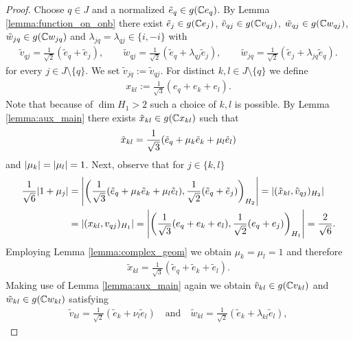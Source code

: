 \begin{proof}
	Choose $q \in J$ and a normalized $\tilde{e}_q \in g{\left ( \mathbb{C} e_q \right )}$. By Lemma \ref{lemma:function_on_onb} there exist $\tilde{e}_j \in g(\mathbb{C} e_j)$, $\tilde{v}_{qj} \in g(\mathbb{C} v_{qj})$, $\tilde{w}_{qj} \in g(\mathbb{C} w_{qj})$, $\tilde{w}_{jq} \in g(\mathbb{C} w_{jq})$ and $\lambda_{jq} = \lambda_{qj} \in \{i, -i\}$ with
	\begin{align*}
	\tilde{v}_{qj} = \frac{1}{\sqrt{2}}(\tilde{e}_q + \tilde{e}_j), \qquad \tilde{w}_{qj} = \frac{1}{\sqrt{2}}(\tilde{e}_q + \lambda_{qj}\tilde{e}_j), \qquad \tilde{w}_{jq} = \frac{1}{\sqrt{2}}(\tilde{e}_j + \lambda_{jq} \tilde{e}_q).
	\end{align*} 
	 for every $j \in J \setminus \{q\}$. We set $\tilde{v}_{jq} := \tilde{v}_{qj}$. For distinct $k,l \in J \setminus \{q\}$ we define
	\begin{align*}
	x_{kl} := \frac{1}{\sqrt{3}}(e_q + e_k + e_l). 
	\end{align*} 
	Note that because of $\dim H_1 > 2$ such a choice of $k,l$ is possible. By Lemma \ref{lemma:aux_main} there exists $\tilde{x}_{kl} \in g(\mathbb{C} x_{kl})$ such that 
	\begin{align*}
	\tilde{x}_{kl} = \frac{1}{\sqrt{3}} {\left ( \tilde{e}_q + \mu_{k} \tilde{e}_k + \mu_{l} \tilde{e}_l \right )} 
	\end{align*}
	and ${\left | \mu_k \right |} = {\left | \mu_l \right |} = 1$. Next, observe that for $j \in \{k,l\}$
	\begin{align*}
	\frac{1}{\sqrt{6}} {\left | 1 + \mu_j \right |} &= {\left | {\left ( \frac{1}{\sqrt{3}} {\left ( \tilde{e}_q + \mu_k \tilde{e}_k + \mu_l \tilde{e}_l \right )}, \frac{1}{\sqrt{2}} {\left ( \tilde{e}_q + \tilde{e}_j \right )} \right )}_{H_2} \right |} = |(\tilde{x}_{kl}, \tilde{v}_{qj})_{H_2}| \\
	&= |(x_{kl}, v_{qj})_{H_1}| = {\left | {\left ( \frac{1}{\sqrt{3}} {\left ( e_q + e_k + e_l \right )}, \frac{1}{\sqrt{2}} (e_q + e_j) \right )}_{H_1} \right |} = \frac{2}{\sqrt{6}}.
	\end{align*}
	Employing Lemma \ref{lemma:complex_geom} we obtain $\mu_k = \mu_l = 1$ and therefore
	\begin{align*}
	\tilde{x}_{kl} = \frac{1}{\sqrt{3}}(\tilde{e}_q + \tilde{e}_k + \tilde{e}_l).
	\end{align*}
	Making use of Lemma \ref{lemma:aux_main} again we obtain $\tilde{v}_{kl} \in g(\mathbb{C} v_{kl})$ and $\tilde{w}_{kl} \in g(\mathbb{C} w_{kl})$ satisfying
	\begin{align*}
	\tilde{v}_{kl} = \frac{1}{\sqrt{2}}(\tilde{e}_k + \nu_l \tilde{e}_l) \quad \text{and} \quad \tilde{w}_{kl} = \frac{1}{\sqrt{2}}(\tilde{e}_k + \lambda_{kl} \tilde{e}_l),

\end{align*}
\end{proof}
